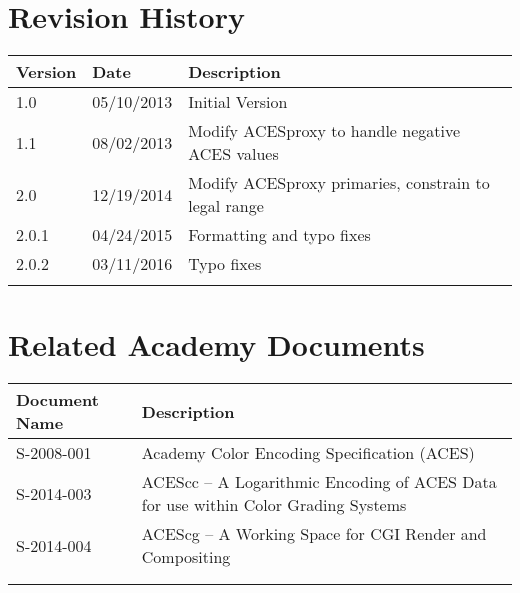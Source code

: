 \prelimsectionformat	%
\chapter{Revision History}

\begin{tabularx}{\linewidth}{|l|l|X|}
    \hline
    Version & Date & Description \\ \hline
    1.0     & 05/10/2013 & Initial Version      \\ \hline
    1.1     & 08/02/2013 & Modify ACESproxy to handle negative ACES values \\ \hline
    2.0     & 12/19/2014 & Modify ACESproxy primaries, constrain to legal range \\ \hline
    2.0.1   & 04/24/2015 & Formatting and typo fixes \\ \hline
    2.0.2   & 03/11/2016 & Typo fixes \\ \hline
            &      &             \\ \hline
\end{tabularx}

\vspace{0.25in} %
\chapter{Related Academy Documents} %
\begin{tabularx}{\linewidth}{|l|X|}
    \hline
    Document Name & Description \\ \hline
    S-2008-001  & Academy Color Encoding Specification (ACES) \\ \hline
    S-2014-003  & ACEScc -- A Logarithmic Encoding of ACES Data for use within Color Grading Systems \\ \hline
    S-2014-004  & ACEScg -- A Working Space for CGI Render and Compositing \\ \hline
    & \\ \hline
    & \\ \hline
\end{tabularx}